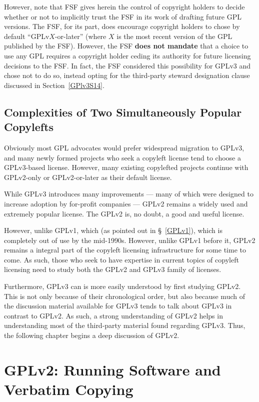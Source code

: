 However, note that FSF gives herein the control of copyright holders to
decide whether or not to implicitly trust the FSF in its work of drafting
future GPL versions.  The FSF, for its part, does encourage copyright holders
to chose by default ``GPLv$X$-or-later'' (where $X$ is the most recent
version of the GPL published by the FSF).  However, the FSF \textbf{does not
  mandate} that a choice to use any GPL requires a copyright holder ceding
its authority for future licensing decisions to the FSF.  In fact, the FSF
considered this possibility for GPLv3 and chose not to do so, instead opting
for the third-party steward designation clause discussed in
Section~\ref{GPlv3S14}.

\section{Complexities of Two Simultaneously Popular Copylefts}

Obviously most GPL advocates would prefer widespread migration to GPLv3, and
many newly formed projects who seek a copyleft license tend to choose a
GPLv3-based license.  However, many existing copylefted projects continue
with GPLv2-only or GPLv2-or-later as their default license.

While GPLv3 introduces many improvements --- many of which were designed to
increase adoption by for-profit companies --- GPLv2 remains a widely used and
extremely popular license.  The GPLv2 is, no doubt, a good and useful
license.

However, unlike GPLv1, which (as pointed out in \S~\ref{GPLv1}), which is
completely out of use by the mid-1990s.  However, unlike GPLv1 before it,
GPLv2 remains a integral part of the copyleft licensing infrastructure for
some time to come.  As such, those who seek to have expertise in current
topics of copyleft licensing need to study both the GPLv2 and GPLv3 family of
licenses.

Furthermore, GPLv3 can is more easily understood by first studying GPLv2.
This is not only because of their chronological order, but also because much
of the discussion material available for GPLv3 tends to talk about GPLv3 in
contrast to GPLv2.  As such, a strong understanding of GPLv2 helps in
understanding most of the third-party material found regarding GPLv3.  Thus,
the following chapter begins a deep discussion of GPLv2.

\chapter{GPLv2: Running Software and Verbatim Copying}
\label{run-and-verbatim}


